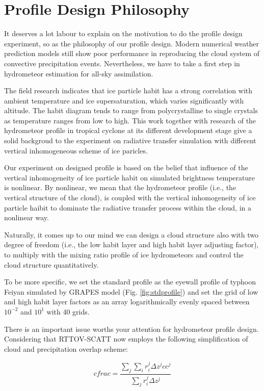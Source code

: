 \section{Profile Design Philosophy}
It deserves a lot labour to explain on the motivation to do the profile design experiment,
so as the philosophy of our profile design. Modern numerical weather prediction models still show
poor performance in reproducing the cloud system of convective precipitation events. 
Nevertheless, we have to take a first step in hydrometeor estimation for all-sky assimilation.

The field research \citep*{Bailey09} indicates that ice particle habit has a strong correlation with ambient
temperature and ice supersaturation, which varies significantly with altitude. The habit diagram tends to range 
from polycrystalline to single crystals as temperature ranges from low to high. 
This work together with research of the hydrometeor profile in tropical cyclone at its different development stage \citep*{Zhou18}
give a solid backgroud to the experiment on radiative transfer 
simulation with different vertical inhomogeneous scheme of ice paricles.  

Our experiment on designed profile is based on the belief that influence of the vertical inhomogeneity 
of ice particle habit on simulated brightness temperature is nonlinear. By nonlinear, we mean that 
the hydrometeor profile (i.e., the vertical structure of the cloud), is coupled with the vertical inhomogeneity 
of ice particle haibit to dominate the radiative transfer process within the cloud, in a nonlinear way.

Naturally, it comes up to our mind we can design a cloud structure also with two degree of freedom (i.e., 
the low habit layer and high habit layer adjusting factor), to multiply with the mixing ratio profile of
ice hydrometeors and control the cloud structure quantitatively.

To be more specific, we set the standard profile as the eyewall profile of typhoon Feiyan 
simulated by GRAPES model (Fig. \ref{fig:stdprofile}) and set the grid of low and high habit layer factors 
as an array logarithmically evenly spaced between $10^{-2}$ and $10^{1}$ with 40 grids.

There is an important issue worths your attention for hydrometeor profile design.
Considering that RTTOV-SCATT now employs the following simplification of cloud and precipitation overlap scheme\citep*{Geer09}:

\begin{equation} \label{eq:cloudoverlap}
    cfrac = \frac{\sum_{j}\sum_{i}r_{i}^{j} \Delta z^{j} cc^{j}}
    {\sum_{j}r_{i}^{j} \Delta z^{j}}
\end{equation}

